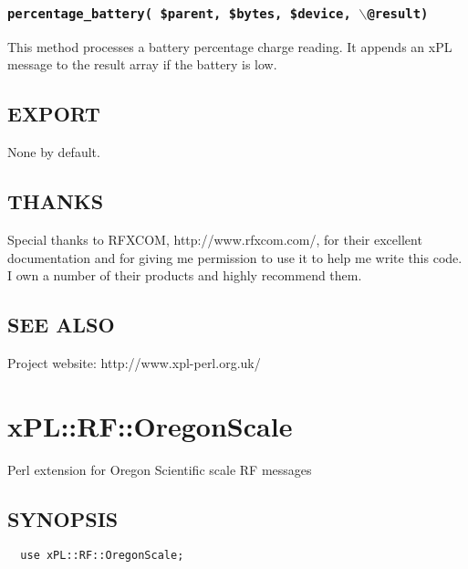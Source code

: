 \documentclass[12pt,a4paper]{article}
\begin{document}
\subsubsection*{\texttt{percentage\_battery( \$parent, \$bytes, \$device, $\backslash$@result)}\label{xPL::RF::Oregon_percentage_battery_parent_bytes_device_backslash_result_}}


This method processes a battery percentage charge reading.  It appends
an xPL message to the result array if the battery is low.

\subsection*{EXPORT\label{xPL::RF::Oregon_EXPORT}}


None by default.

\subsection*{THANKS\label{xPL::RF::Oregon_THANKS}}


Special thanks to RFXCOM, \textsf{http://www.rfxcom.com/}, for their
excellent documentation and for giving me permission to use it to help
me write this code.  I own a number of their products and highly
recommend them.

\subsection*{SEE ALSO\label{xPL::RF::Oregon_SEE_ALSO}}


Project website: http://www.xpl-perl.org.uk/

\newpage
\section{xPL::RF::OregonScale\label{xPL::RF::OregonScale}}


Perl extension for Oregon Scientific scale RF messages

\subsection*{SYNOPSIS\label{xPL::RF::OregonScale_SYNOPSIS}}
\begin{verbatim}
  use xPL::RF::OregonScale;
\end{verbatim}
\end{document}
